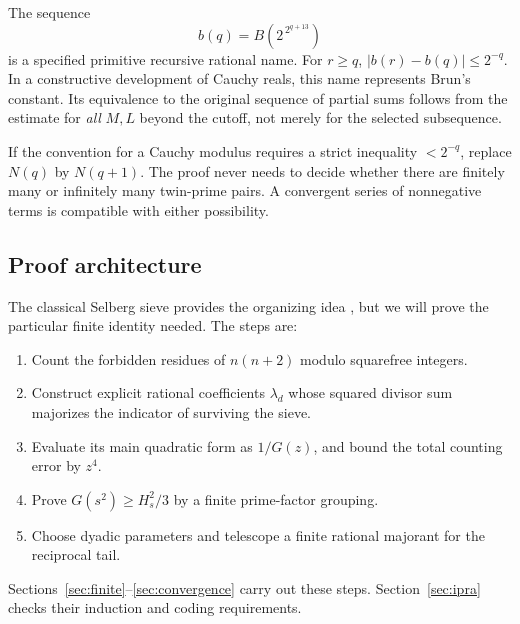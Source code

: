The sequence
\[
 b(q)=B\!\left(2^{\,2^{q+13}}\right)
\]
is a specified primitive recursive rational name. For \(r\ge q\),
\(\lvert b(r)-b(q)\rvert\le2^{-q}\).
In a constructive development of Cauchy reals, this name represents Brun's
constant. Its equivalence to the original sequence of partial sums follows
from the estimate for \emph{all} \(M,L\) beyond the cutoff, not merely for
the selected subsequence.

If the convention for a Cauchy modulus requires a strict inequality
\(<2^{-q}\), replace \(N(q)\) by \(N(q+1)\).
The proof never needs to decide whether there are finitely many or infinitely
many twin-prime pairs. A convergent series of nonnegative terms is compatible
with either possibility.

\subsection{Proof architecture}

The classical Selberg sieve provides the organizing idea
\cite{kedlaya,tau}, but we will prove the particular finite identity needed.
The steps are:
\begin{enumerate}
\item Count the forbidden residues of \(n(n+2)\) modulo squarefree integers.
\item Construct explicit rational coefficients \(\lambda_d\) whose squared
divisor sum majorizes the indicator of surviving the sieve.
\item Evaluate its main quadratic form as \(1/G(z)\), and bound the total
counting error by \(z^4\).
\item Prove \(G(s^2)\ge H_s^2/3\) by a finite prime-factor grouping.
\item Choose dyadic parameters and telescope a finite rational majorant
for the reciprocal tail.
\end{enumerate}
Sections~\ref{sec:finite}--\ref{sec:convergence} carry out these steps.
Section~\ref{sec:ipra} checks their induction and coding requirements.
